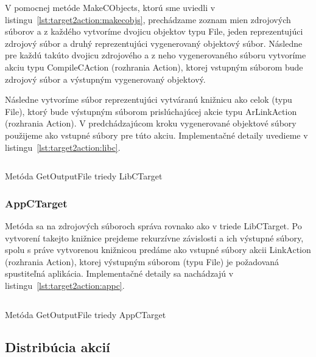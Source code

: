 V pomocnej metóde MakeCObjects, ktorú sme uviedli v listingu~\ref{lst:target2action:makecobjs},
prechádzame zoznam mien zdrojových súborov a z každého vytvoríme dvojicu objektov
typu File, jeden reprezentujúci zdrojový súbor a druhý reprezentujúci vygenerovaný
objektový súbor. Následne pre každú takúto dvojicu zdrojového a z neho vygenerovaného
súboru vytvoríme akciu typu CompileCAction (rozhrania Action), ktorej vstupným
súborom bude zdrojový súbor a výstupným vygenerovaný objektový.

Následne vytvoríme súbor reprezentujúci vytváranú knižnicu ako celok (typu File),
ktorý bude výstupným súborom prislúchajúcej akcie typu ArLinkAction (rozhrania Action).
V predchádzajúcom kroku vygenerované objektové súbory použijeme ako vstupné
súbory pre túto akciu. Implementačné detaily uvedieme v listingu~\ref{lst:target2action:libc}.

\begin{listing}[H]
  \inputminted[frame=lines,framesep=2mm,linenos,fontsize=\scriptsize,firstline=48,lastline=74]{go}{/home/pepol/src/imterra/forge/client/target/target.go}
  \caption{Metóda GetOutputFile triedy LibCTarget}
  \label{lst:target2action:libc}
\end{listing}

\subsubsection{AppCTarget}
Metóda sa na zdrojových súboroch správa rovnako ako v triede LibCTarget. Po
vytvorení takejto knižnice prejdeme rekurzívne závislosti a ich výstupné
súbory, spolu s práve vytvorenou knižnicou predáme ako vstupné súbory
akcii LinkAction (rozhrania Action), ktorej výstupným súborom (typu File)
je požadovaná spustiteľná aplikácia. Implementačné detaily sa nachádzajú v
listingu~\ref{lst:target2action:appc}.

\begin{listing}[H]
  \inputminted[frame=lines,framesep=2mm,linenos,fontsize=\scriptsize,firstline=92,lastline=131]{go}{/home/pepol/src/imterra/forge/client/target/target.go}
  \caption{Metóda GetOutputFile triedy AppCTarget}
  \label{lst:target2action:appc}
\end{listing}

\subsection{Distrib\'{u}cia akci\'{i}}
\label{sec:master:distribution}


